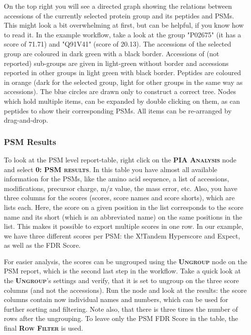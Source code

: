 \documentclass[a4paper,11pt,twoside]{article}
\newcommand{\menu}[1]{{\scshape\bfseries #1}}
\newcommand{\knimenode}[1]{{\scshape\bfseries #1}}
\begin{document}
On the top right you will see a directed graph showing the relations between
accessions of the currently selected protein group and its peptides and PSMs.
This might look a bit overwhelming at first, but can be helpful, if you know
how to read it. In the example workflow, take a look at the group "P02675" (it
has a score of 71.71) and "Q91V41" (score of 20.13). The accessions of the
selected group are coloured in dark green with a black border. Accessions of
(not reported) sub-groups are given in light-green without border and accessions
reported in other groups in light green with black border. Peptides are coloured
in orange (dark for the selected group, light for other groups in the same way
as accessions). The blue circles are drawn only to construct a correct tree.
Nodes which hold multiple items, can be expanded by double clicking on them, as
can peptides to show their corresponding PSMs. All items can be re-arranged by
drag-and-drop.


\subsubsection{PSM Results}

To look at the PSM level report-table, right click on the \knimenode{PIA
Analysis} node and select \menu{0: PSM results}. In this table you have almost
all available information for the PSMs, like the amino acid sequence, a list of
accessions, modifications, precursor charge, m/z value, the mass error, etc.
Also, you have three columns for the scores (scores, score names and score
shorts), which are lists each. Here, the score on a given position in the list
corresponds to the score name and its short (which is an abbreviated name) on
the same positions in the list. This makes it possible to export multiple scores
in one row. In our example, we have three different scores per PSM: the
X!Tandem Hyperscore and Expect, as well as the FDR Score.

For easier analysis, the scores can be ungrouped using the \knimenode{Ungroup}
node on the PSM report, which is the second last step in the workflow. Take a
quick look at the \knimenode{Ungroup}'s settings and verify, that it is set to
ungroup on the three score columns (and not the accessions). Run the node and
look at the results: the score columns contain now individual names and
numbers, which can be used for further sorting and filtering. Note also, that
there is three times the number of rows after the ungrouping. To leave only the
PSM FDR Score in the table, the final \knimenode{Row Filter} is used.
\end{document}
